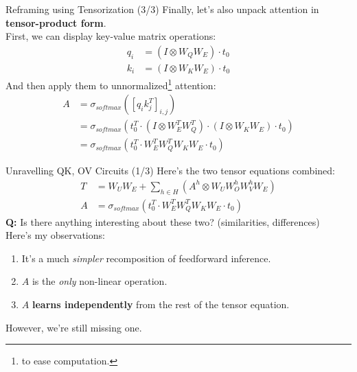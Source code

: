 \documentclass{beamer}
\begin{document}
\bgroup
\let\oldfootnoterule\footnoterule
\def\footnoterule{\only<3->\oldfootnoterule}
\begin{frame}{Reframing using Tensorization (3/3)}
	Finally, let's also unpack attention in \textbf{tensor-product form}. \pause \newline \\

	First, we can display key-value matrix operations:
	\begin{align}
		q_i &= (I \otimes W_QW_E) \cdot t_0 \\
		k_i &= (I \otimes W_KW_E) \cdot t_0
	\end{align} \pause
	And then apply them to unnormalized\footnote<3->{to ease computation.} attention:
	\begin{align}
		A &= \sigma_{softmax}\left([q_i k_j^T]_{i,j}\right) \\
		&= \sigma_{softmax}\left(t_0^T \cdot (I \otimes W_E^TW_Q^T) \cdot (I \otimes W_KW_E) \cdot t_0 \right) \\
		&= \sigma_{softmax}\left(t_0^T \cdot W_E^TW_Q^TW_KW_E \cdot t_0 \right)
	\end{align}
\end{frame}
\egroup

\begin{frame}{Unravelling QK, OV Circuits (1/3)}
	Here's the two tensor equations combined:
	\begin{align}
		T &= W_UW_E + \sum_{h \in H} (A^h \otimes W_UW_O^h W_V^hW_E) \tag{10} \\
		A &= \sigma_{softmax}\left(t_0^T \cdot W_E^TW_Q^TW_KW_E \cdot t_0 \right) \tag{15}
	\end{align} \pause
	\textbf{Q:} Is there anything interesting about these two? (similarities, differences) \pause \newline \\

	Here's my observations:
	\begin{enumerate}[label=\alph*.]
		\item It's a much \textit{simpler} recomposition of feedforward inference. \pause
		\item $A$ is the \textit{only} non-linear operation. \pause
		\item $A$ \textbf{learns independently} from the rest of the tensor equation.
	\end{enumerate} \pause

	However, we're still missing one.
\end{frame}
\end{document}
